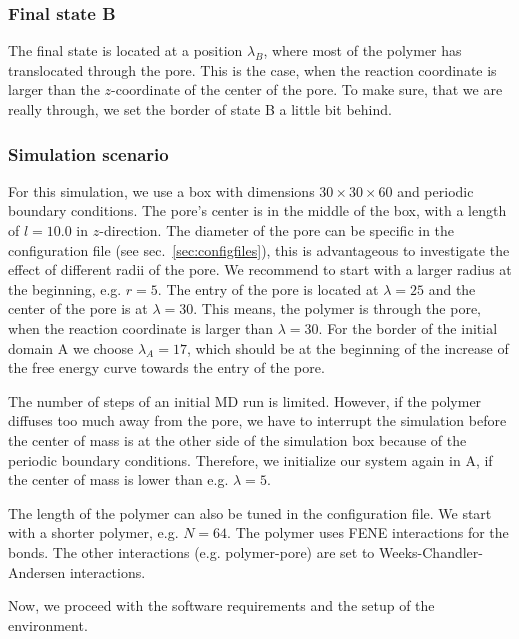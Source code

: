 \documentclass[a4paper,oneside]{article}
\begin{document}
\subsubsection{Final state B}\label{sec:arrivedB}
The final state is located at a position $\lambda_B$, where most of the polymer has translocated through the pore. This is the case, when the reaction coordinate is larger than the $z$-coordinate of the center of the pore. To make sure, that we are really through, we set the border of state B a little bit behind. 

\subsubsection{Simulation scenario}
For this simulation, we use a box with dimensions $30\times30\times60$ and periodic boundary conditions. The pore's center is in the middle of the box, with a length of $l=10.0$ in $z$-direction. The diameter of the pore can be specific in the configuration file (see sec.~\ref{sec:configfiles}), this is advantageous to investigate the effect of different radii of the pore. We recommend to start with a larger radius at the beginning, e.g. $r=5$. The entry of the pore is located at $\lambda=25$ and the center of the pore is at $\lambda=30$. This means, the polymer is through the pore, when the reaction coordinate is larger than $\lambda=30$. For the border of the initial domain A we choose $\lambda_A=17$, which should be at the beginning of the increase of the free energy curve towards the entry of the pore. 

The number of steps of an initial MD run is limited. However, if the polymer diffuses too much away from the pore, we have to interrupt the simulation before the center of mass is at the other side of the simulation box because of the periodic boundary conditions. Therefore, we initialize our system again in A, if the center of mass is lower than e.g. $\lambda=5$.

The length of the polymer can also be tuned in the configuration file. We start with a shorter polymer, e.g. $N=64$. The polymer uses FENE interactions for the bonds. The other interactions (e.g. polymer-pore) are set to Weeks-Chandler-Andersen interactions.

Now, we proceed with the software requirements and the setup of the environment.
\end{document}
